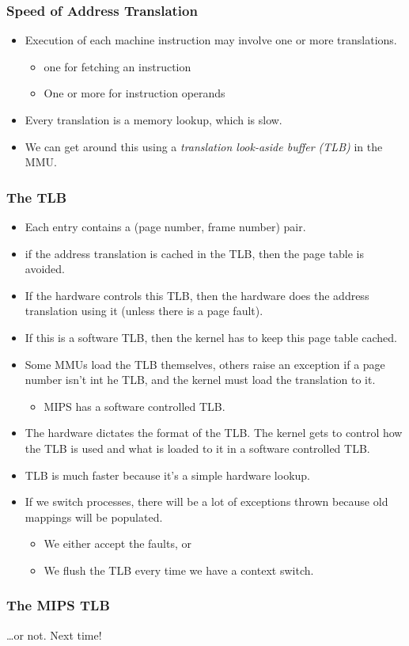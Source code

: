 \documentclass[12pt]{article}
\begin{document}
\subsubsection{Speed of Address Translation}

\begin{itemize}
	\item Execution of each machine instruction may involve one or more
		translations.
		\begin{itemize}
			\item one for fetching an instruction
			\item One or more for instruction operands
		\end{itemize}
	\item Every translation is a memory lookup, which is slow.
	\item We can get around this using a \emph{translation look-aside buffer
		(TLB)} in the MMU.
\end{itemize}

\subsubsection{The TLB}
\begin{itemize}
	\item Each entry contains a (page number, frame number) pair.
	\item if the address translation is cached in the TLB, then the page
		table is avoided.
	\item If the hardware controls this TLB, then the hardware does the address
		translation using it (unless there is a page fault).
	\item If this is a software TLB, then the kernel has to keep this page table
		cached.
	\item Some MMUs load the TLB themselves, others raise an exception if a page
		number isn't int he TLB, and the kernel must load the translation to it.
		\begin{itemize}
			\item MIPS has a software controlled TLB.
		\end{itemize}
	\item The hardware dictates the format of the TLB. The kernel gets to
		control how the TLB is used and what is loaded to it in a software
		controlled TLB.
	\item TLB is much faster because it's a simple hardware lookup.
	\item If we switch processes, there will be a lot of exceptions thrown
		because old mappings will be populated.
		\begin{itemize}
			\item We either accept the faults, or
			\item We flush the TLB every time we have a context switch.
		\end{itemize}
\end{itemize}

\subsubsection{The MIPS TLB}

\dots or not. Next time!
\end{document}
